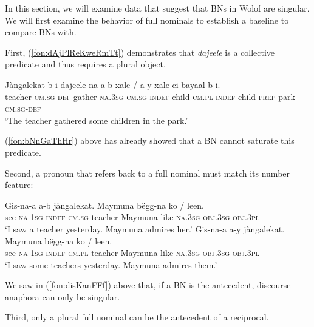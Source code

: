 \documentclass[output=paper]{langscibook}
\begin{document}
In this section, we will examine data that suggest that BNs in Wolof are singular. We will first examine the behavior of full nominals to establish a baseline to compare BNs with.

First, (\ref{fon:dAjPlReKweRmTt}) demonstrates that \textit{dajeele} is a collective predicate and thus requires a plural object.
	
	\ea \gll	J\`{a}ngalekat b-i dajeele-na \minsp{*} a-b xale / a-y xale ci bayaal b-i.\\
			teacher \textsc{cm.sg-def} gather-\textsc{na.3sg} {} \textsc{cm.sg-indef} child {} \textsc{cm.pl-indef} child \textsc{prep} park \textsc{cm.sg-def}\\
			\glt `The teacher gathered some children in the park.'\label{fon:dAjPlReKweRmTt}
	\z

\noindent   (\ref{fon:bNnGaThHr}) above has already showed that a BN cannot saturate this predicate.
	
Second, a pronoun that refers back to a full nominal must match its number feature:
	
	\ea
		\ea \gll	Gis-na-a a-b j\`{a}ngalekat. Maymuna b\"{e}gg-na ko /\hspace{5pt} \minsp{*} leen.\\
					see-\textsc{na-1sg} \textsc{indef-cm.sg} teacher Maymuna like-\textsc{na.3sg} \textsc{obj.3sg} {} {} \textsc{obj.3pl}\\
					\glt   `I saw a teacher yesterday. Maymuna admires her.'
		\ex \gll	Gis-na-a a-y j\`{a}ngalekat. Maymuna b\"{e}gg-na \minsp{*} ko / leen.\\
					see-\textsc{na-1sg} \textsc{indef-cm.pl} teacher Maymuna like-\textsc{na.3sg} {} \textsc{obj.3sg} {} \textsc{obj.3pl}\\
					\glt   `I saw some teachers yesterday. Maymuna admires them.'
		\z
	\z

\noindent   We saw in (\ref{fon:disKanFFf}) above that, if a BN is the antecedent, discourse anaphora can only be singular.
	
Third, only a plural full nominal can be the antecedent of a reciprocal.
	
	\ea
	    \label{fon:waNAleNoPeGaPe1}
	    \label{fon:waNAleNoPe1}
		\z
	\z
\end{document}

